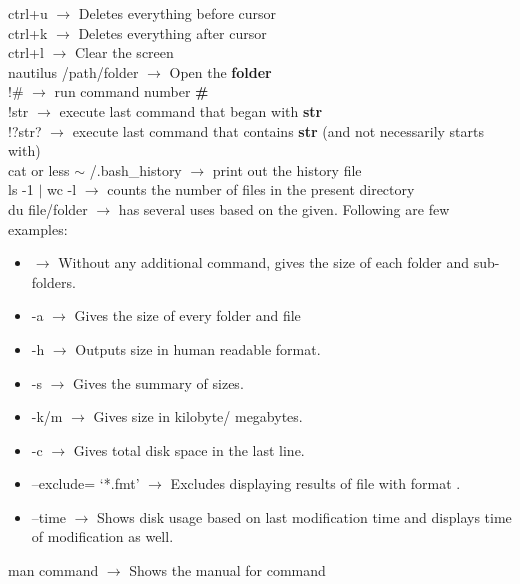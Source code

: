 \documentclass[twoside,a4paper]{article}
\newcommand{\tcb}{\color{blue}}
\newcommand{\tcr}{\color{red}}
\newcommand{\tck}{\color{black}}
\newcommand{\ra }{$\rightarrow$ }
\newcommand{\hs}{\hspace}
\begin{document}
\begin{multicols}{2}
    \hs{-0.5 cm}\tcr  ctrl+u \tck  \ra Deletes
    everything before cursor\\
    \tcr  ctrl+k \tck  \ra Deletes everything after
    cursor\\
    \tcr  ctrl+l \tck  \ra Clear the screen\\
    \tcr   nautilus \tcb  /path/folder \tck  \ra Open
    the \textbf{folder}\\
    \tcr !\tcb \# \tck \ra run command
    number \textbf{\#}\\
    \tcr !\tcb str \tck \ra execute last
    command that began with \textbf{str}\\
    \tcr !\tcb ?str? \tck \ra execute last
    command that contains \textbf{str} (and not necessarily starts with)\\
    \tcr cat or less \tcb $\sim$ /.bash\_history \tck
    \ra print out the history file\\
    \tcr ls -1 $\mid$ wc -l \tck
    \ra counts the number of files in the present directory\\
    \tcr du \tcb {-command} \color{magenta} file/folder \tck
    \ra has several uses based on the \tcb {command}
    \tck given. Following are few examples:\\
    \begin{itemize}
        \item \tck \ra Without any additional command, gives
              the size of each folder and sub-folders.
        \item \tcb  -a \tck \ra Gives the size of every
              folder and file
        \item \tcb  -h \tck \ra Outputs size in human
              readable format.
        \item \tcb  -s \tck \ra Gives the summary of sizes.
        \item \tcb  -k/m \tck \ra Gives size in kilobyte/
              megabytes.
        \item \tcb  -c \tck \ra Gives total disk space
              in the last line.
        \item \tcb  --exclude= \color{magenta}`*.fmt' \tck $\rightarrow$
              Excludes displaying results of file with format \color{magenta}{fmt} \tck .
        \item \tcb  --time \tck \ra Shows disk usage based
              on last modification time and displays time of modification as well.
    \end{itemize}
    \tcr man \tcb  command \tck \ra Shows the
    manual for \tcr  \tcb  command\\

\end{multicols}
\end{document}
